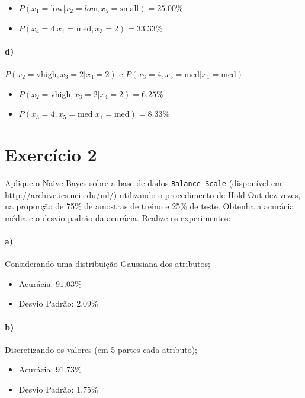 \documentclass{article}
\begin{document}
\begin{itemize}
	\item $P(x_1=\text{low}|x_2=low,x_5=\text{small}) = 25.00\%$
	\item $P(x_4=4|x_1=\text{med},x_3=2) = 33.33\%$
\end{itemize}

\paragraph{d)} $P(x_2= \text{vhigh},x_3=2|x_4=2)$ e $P(x_3=4,x_5=\text{med}|x_1=\text{med})$

\begin{itemize}
	\item $P(x_2= \text{vhigh},x_3=2|x_4=2) = 6.25\%$
	\item $P(x_3=4,x_5=\text{med}|x_1=\text{med}) = 8.33\%$
\end{itemize}

\section{Exercício 2}

Aplique o Naive Bayes sobre a base de dados \texttt{Balance Scale} (disponível em \url{http://archive.ics.uci.edu/ml/}) utilizando o procedimento de Hold-Out dez vezes, na proporção de 75\% de amostras de treino e 25\% de teste. Obtenha a acurácia média e o desvio padrão da acurácia. Realize os experimentos:

\paragraph{a)} Considerando uma distribuição Gaussiana dos atributos;

\begin{itemize}
	\item Acurácia: $91.03\%$
	\item Desvio Padrão: $2.09\%$
\end{itemize}

\paragraph{b)} Discretizando os valores (em 5 partes cada atributo);

\begin{itemize}
	\item Acurácia: $91.73\%$
	\item Desvio Padrão: $1.75\%$
\end{itemize}
\end{document}
